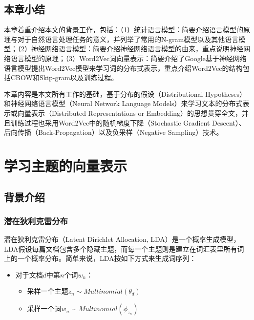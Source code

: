 \documentclass[master]{njuthesis}
\begin{document}
\section{本章小结}\label{sec_chap2_conclusions}

本章着重介绍本文的背景工作，包括：（1）统计语言模型：简要介绍语言模型的原理与对于自然语言处理任务的意义，并列举了常用的N-gram模型以及其他语言模型；（2）神经网络语言模型：简要介绍神经网络语言模型的由来，重点说明神经网络语言模型的原理；（3）Word2Vec词向量表示：简要介绍了Google基于神经网络语言模型提出Word2Vec模型来学习词的分布式表示，重点介绍Word2Vec的结构包括CBOW和Skip-gram以及训练过程。

本章内容是本文所有工作的基础，基于分布的假设（Distributional Hypotheses）和神经网络语言模型（Neural Network Language Models）来学习文本的分布式表示或向量表示（Distributed Representations or Embedding）的思想贯穿全文，并且训练过程也采用Word2Vec中的随机梯度下降（Stochastic Gradient Descent）、后向传播（Back-Propagation）以及负采样（Negative Sampling）技术。

\chapter{学习主题的向量表示}\label{chapter3_topic_representations}

\section{背景介绍}\label{sec_chap3_bg}
\subsection{潜在狄利克雷分布}\label{subsec_chap3_lda}

潜在狄利克雷分布（Latent Dirichlet Allocation, LDA）\cite{blei2003latent}是一个概率生成模型，LDA假设每篇文档包含多个隐藏主题，而每一个主题则是建立在词汇表里所有词上的一个概率分布。简单来说，LDA按如下方式来生成词序列：

\begin{itemize}
\item 对于文档$d$中第$n$个词$w_n$：
		\begin{itemize}
		\item 采样一个主题$z_n\sim Multinomial(\theta_d)$
		\item 采样一个词$w_n\sim Multinomial(\phi_{z_n})$
		\end{itemize}
\end{itemize}
\end{document}
